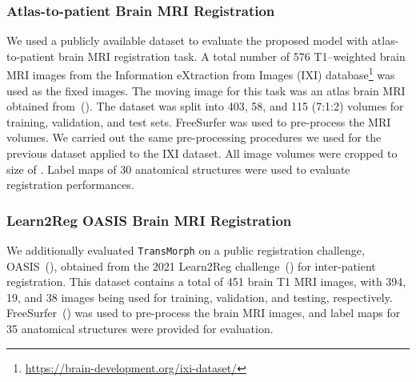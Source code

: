\documentclass[times,twocolumn,final]{elsarticle}
\begin{document}
\subsubsection{Atlas-to-patient Brain MRI Registration}
We used a publicly available dataset to evaluate the proposed model with atlas-to-patient brain MRI registration task. A total number of 576 T1–weighted brain MRI images from the Information eXtraction from Images (IXI) database\footnote{\url{https://brain-development.org/ixi-dataset/}} was used as the fixed images. The moving image for this task was an atlas brain MRI obtained from~(\cite{kim2021cyclemorph}). The dataset was split into 403, 58, and 115 (7:1:2) volumes for training, validation, and test sets. FreeSurfer was used to pre-process the MRI volumes. We carried out the same pre-processing procedures we used for the previous dataset applied to the IXI dataset. All image volumes were cropped to size of . Label maps of 30 anatomical structures were used to evaluate registration performances.

\subsubsection{Learn2Reg OASIS Brain MRI Registration}
We additionally evaluated \texttt{TransMorph} on a public registration challenge, OASIS~(\cite{marcus2007open, hoopes2021hypermorph}), obtained from the 2021 Learn2Reg challenge~(\cite{hering2021learn2reg}) for inter-patient registration. This dataset contains a total of 451 brain T1 MRI images, with 394, 19, and 38 images being used for training, validation, and testing, respectively. FreeSurfer~(\cite{fischl2012freesurfer}) was used to pre-process the brain MRI images, and label maps for 35 anatomical structures were provided for evaluation.
\end{document}
